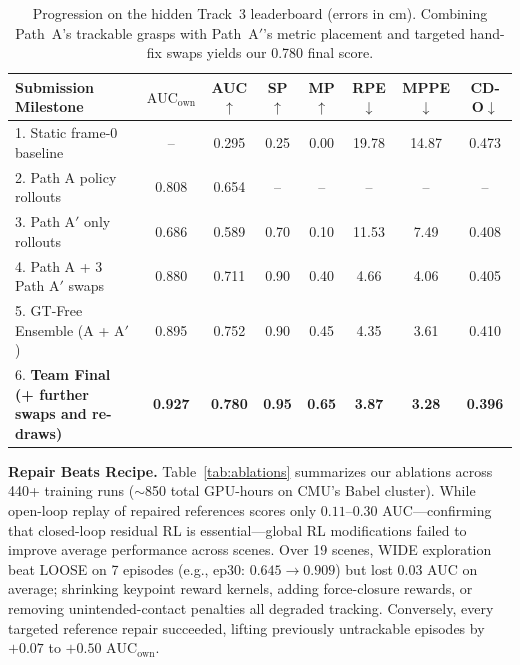 \documentclass[10pt]{nvidiaextabstract}
\newcommand{\ownauc}{\ensuremath{\mathrm{AUC}_{\text{own}}}\xspace}
\begin{document}
\begin{table}[t]
  \centering\footnotesize
  \setlength{\tabcolsep}{2.8pt}
  \begin{tabular}{@{}lccccccc@{}}
    \toprule
    \textbf{Submission Milestone} & \textbf{\ownauc} & \textbf{AUC}$\uparrow$ & \textbf{SP}$\uparrow$ & \textbf{MP}$\uparrow$ & \textbf{RPE}$\downarrow$ & \textbf{MPPE}$\downarrow$ & \textbf{CD-O}$\downarrow$ \\
    \midrule
    1. Static frame-0 baseline & -- & 0.295 & 0.25 & 0.00 & 19.78 & 14.87 & 0.473 \\
    2. Path A policy rollouts & 0.808 & 0.654 & -- & -- & -- & -- & -- \\
    3. Path A$'$ only rollouts & 0.686 & 0.589 & 0.70 & 0.10 & 11.53 & 7.49 & 0.408 \\
    4. Path A + 3 Path A$'$ swaps & 0.880 & 0.711 & 0.90 & 0.40 & 4.66 & 4.06 & 0.405 \\
    5. GT-Free Ensemble (A + A$'$) & 0.895 & 0.752 & 0.90 & 0.45 & 4.35 & 3.61 & 0.410 \\
    6. \textbf{Team Final (+ further swaps and re-draws)} & \textbf{0.927} & \textbf{0.780} & \textbf{0.95} & \textbf{0.65} & \textbf{3.87} & \textbf{3.28} & \textbf{0.396} \\
    \bottomrule
  \end{tabular}
  \vspace{-2mm}
  \caption{Progression on the hidden Track~3 leaderboard (errors in cm). Combining Path~A's trackable grasps with Path~A$'$'s metric placement and targeted hand-fix swaps yields our 0.780 final score.}
  \label{tab:kaggle}
  \vspace{-3mm}
\end{table}

\textbf{Repair Beats Recipe.} Table~\ref{tab:ablations} summarizes our ablations across 440+ training runs ($\sim$850 total GPU-hours on CMU's Babel cluster). While open-loop replay of repaired references scores only $0.11$--$0.30$ AUC—confirming that closed-loop residual RL is essential—global RL modifications failed to improve average performance across scenes. Over 19 scenes, WIDE exploration beat LOOSE on 7 episodes (e.g., ep30: $0.645 \rightarrow 0.909$) but lost $0.03$ AUC on average; shrinking keypoint reward kernels, adding force-closure rewards, or removing unintended-contact penalties all degraded tracking. Conversely, every targeted reference repair succeeded, lifting previously untrackable episodes by $+0.07$ to $+0.50$ \ownauc.
\end{document}
